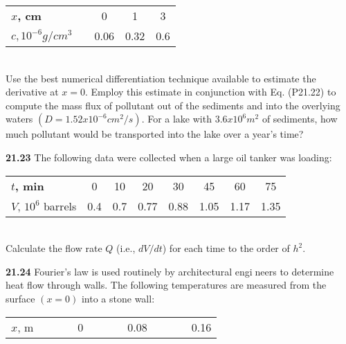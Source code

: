 \begin{multicols}{2}
\begin{tabular}{lcccc}
	\textbf{$x$, cm} & \vspace{} & 0 & 1 & 3\\
	
	\textbf{$c, 10^{-6} g/cm^{3}$} & \vspace{} & 0.06 & 0.32 & 0.6\\

\hline
\end{tabular}\\
Use the best numerical differentiation technique available to
estimate the derivative at $x = 0$. Employ this estimate in
conjunction with Eq. (P21.22) to compute the mass flux of
pollutant out of the sediments and into the overlying waters $(D=1.52 x 10^{-6} cm^{2}/s)$. For a lake with $3.6 x 10^{6} m^{2}$ of
sediments, how much pollutant would be transported into
the lake over a year’s time? 

\textbf{21.23} The following data were collected when a large oil
tanker was loading: \\
\begin{tabular}{lccccccc}
\hline

	\scriptsize{\textbf{$t$, min}} & \scriptsize{0} & \scriptsize{10} & \scriptsize{20} & \scriptsize{30} & \scriptsize{45} & \scriptsize{60} & \scriptsize{75}\\
	
	\scriptsize{$V$, $10^{6}$ barrels} & \scriptsize{0.4} & \scriptsize{0.7} & \scriptsize{0.77} & \scriptsize{0.88} & \scriptsize{1.05} & \scriptsize{1.17} & \scriptsize{1.35}\\

\hline
\end{tabular}\\
Calculate the flow rate $Q$ (i.e., $dV/dt$) for each time to the
order of $h^{2}$.

\textbf{21.24} Fourier’s law is used routinely by architectural engineers to determine heat flow through walls. The following
temperatures are measured from the surface $(x = 0)$ into a
stone wall: \\
\begin{tabular}{lcccccccccccc}
\hline

	$x$, m & \vspace{} & \vspace{} & \vspace{} & 0 & \vspace{} & \vspace{} & \vspace{} & 0.08 & \vspace{} & \vspace{} & \vspace{} & 0.16\\
	

\end{tabular}
\end{multicols}
